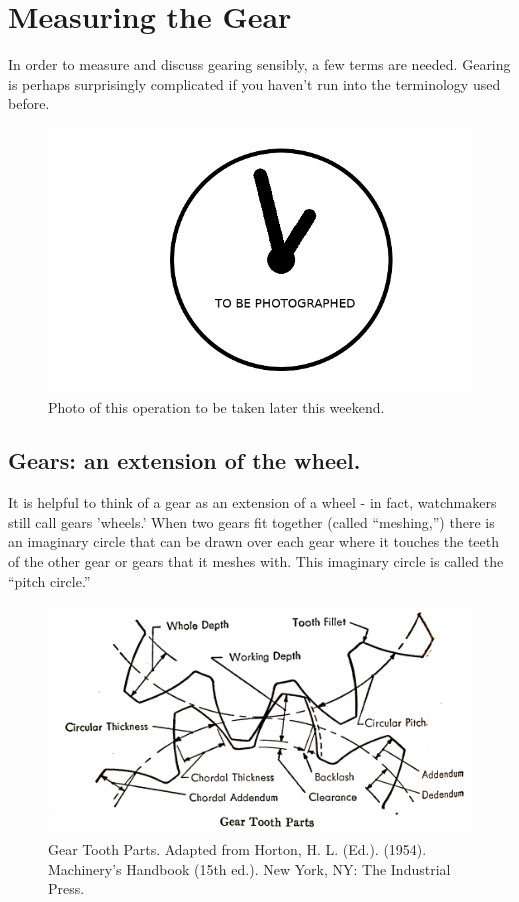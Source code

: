 \documentclass[12pt,twoside,letterpaper]{article}
\begin{document}
\section{Measuring the Gear}

In order to measure and discuss gearing sensibly, a few terms are needed. Gearing is perhaps surprisingly complicated if you haven't run into the terminology used before.

\begin{figure}[H]
	\centering
\includegraphics[width=5in]{imgpending}
\caption{Photo of this operation to be taken later this weekend.}
\end{figure}


\subsection{Gears: an extension of the wheel.}


It is helpful to think of a gear as an extension of a wheel - in fact, watchmakers still call gears 'wheels.' When two gears fit together (called ``meshing,'') there is an imaginary circle that can be drawn over each gear where it touches the teeth of the other gear or gears that it meshes with. This imaginary circle is called the ``pitch circle.''

\begin{figure}[H]
\centering
\includegraphics[width=5in]{gearparts1}
	\caption{Gear Tooth Parts. Adapted from Horton, H. L. (Ed.). (1954). Machinery's Handbook (15th ed.). New York, NY: The Industrial Press. }
\end{figure}
\end{document}
